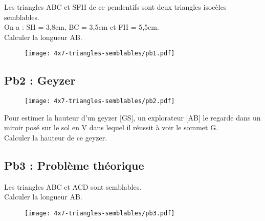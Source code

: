 \begin{multicols}{2}
Les triangles ABC et SFH de ce pendentifs sont deux triangles isocèles semblables. \\ 

On a : SH = 3,8cm, BC = 3,5cm et FH = 5,5cm. \\ 
Calculer la longueur AB.

\begin{figure}[H]
  \centering
  \texttt{[image: 4x7-triangles-semblables/pb1.pdf]}
\end{figure}

\end{multicols} 

\subsection*{Pb2 : Geyzer}

\begin{figure}[H]
  \centering
  \texttt{[image: 4x7-triangles-semblables/pb2.pdf]}
\end{figure}

Pour estimer la hauteur d'un geyzer [GS], un explorateur [AB] le regarde dans un miroir posé sur le sol en V dans lequel il réussit à voir le sommet G. \\

Calculer la hauteur de ce geyzer.

\subsection*{Pb3 : Problème théorique}

\begin{multicols}{2}

  Les triangles ABC et ACD sont semblables. \\

  Calculer la longueur AB. 

\begin{figure}[H]
  \centering
  \texttt{[image: 4x7-triangles-semblables/pb3.pdf]}
\end{figure}

\end{multicols} 


